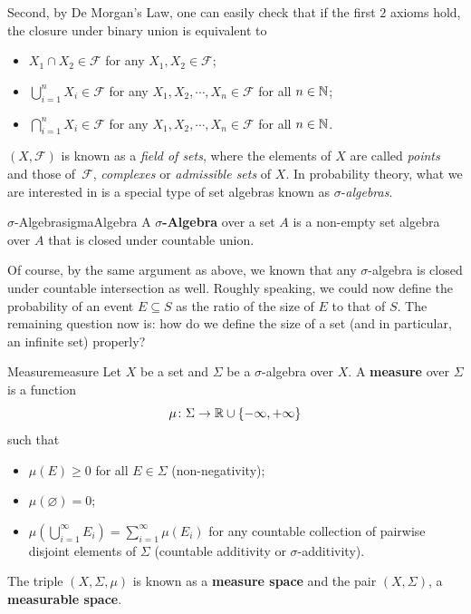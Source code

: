 \documentclass[math]{amznotes}
\theoremstyle{remark}
\newcommand{\0}{\mathbf{0}}
\newcommand{\1}{\mathbf{1}}
\begin{document}
Second, by De Morgan's Law, one can easily check that if the first $2$ axioms hold, the closure under binary union is equivalent to 
\begin{itemize}
    \item $X_1 \cap X_2 \in \mathcal{F}$ for any $X_1, X_2 \in \mathcal{F}$;
    \item $\bigcup_{i = 1}^{n}X_i \in \mathcal{F}$ for any $X_1, X_2, \cdots, X_n \in \mathcal{F}$ for all $n \in \mathbb{N}$;
    \item $\bigcap_{i = 1}^{n}X_i \in \mathcal{F}$ for any $X_1, X_2, \cdots, X_n \in \mathcal{F}$ for all $n \in \mathbb{N}$.
\end{itemize}
$\left(X, \mathcal{F}\right)$ is known as a \textit{field of sets}, where the elements of $X$ are called \textit{points} and those of~$\mathcal{F}$, \textit{complexes} or \textit{admissible sets} of $X$. In probability theory, what we are interested in is a special type of set algebras known as $\sigma$-\textit{algebras}.
\begin{dfnbox}{$\sigma$-Algebra}{sigmaAlgebra}
    A {\color{red} \textbf{$\sigma$-Algebra}} over a set $A$ is a non-empty set algebra over $A$ that is closed under countable union.
\end{dfnbox}
Of course, by the same argument as above, we known that any $\sigma$-algebra is closed under countable intersection as well. Roughly speaking, we could now define the probability of an event $E \subseteq S$ as the ratio of the size of $E$ to that of $S$. The remaining question now is: how do we define the size of a set (and in particular, an infinite set) properly?
\begin{dfnbox}{Measure}{measure}
    Let $X$ be a set and $\Sigma$ be a $\sigma$-algebra over $X$. A {\color{red} \textbf{measure}} over $\Sigma$ is a function 
    \begin{equation*}
        \mu \colon \Sigma \to \mathbb{R} \cup \{-\infty, +\infty\}
    \end{equation*}
    such that 
    \begin{itemize}
        \item $\mu\left(E\right) \geq 0$ for all $E \in \Sigma$ (non-negativity);
        \item $\mu\left(\varnothing\right) = 0$;
        \item $\mu\left(\bigcup_{i = 1}^{\infty}E_i\right) = \sum_{i = 1}^{\infty}\mu\left(E_i\right)$ for any countable collection of pairwise disjoint elements of $\Sigma$ (countable additivity or $\sigma$-additivity).
    \end{itemize}
    The triple $\left(X, \Sigma, \mu\right)$ is known as a {\color{red} \textbf{measure space}} and the pair $\left(X, \Sigma\right)$, a {\color{red} \textbf{measurable space}}.
\end{dfnbox}
\end{document}
